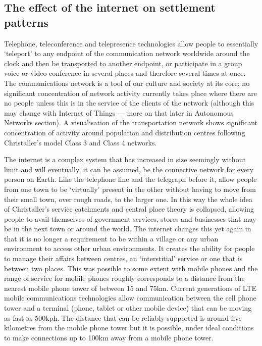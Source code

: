 \subsection{The effect of the internet on settlement patterns}
Telephone, teleconference and telepresence technologies allow people to essentially `teleport' to any endpoint of the communication network worldwide around the clock and then be transported to another endpoint, or participate in a group voice or video conference  in several places and therefore several times at once. The communications network is a tool of our culture and society at its core; no significant concentration of network activity currently takes place where there are no people unless this is in the service of the clients of the network (although this may change with Internet of Things --- more on that later in Autonomous Networks section). A visualisation of the transportation network shows significant concentration of activity around population and distribution centres following Christaller's model Class 3 and Class 4 networks. 


The internet is a complex system that has increased in size seemingly without limit and will eventually, it can be assumed, be the connective network for every person on Earth. Like the telephone line and the telegraph before it, allow people from one town to be `virtually' present in the other without having to move from their small town, over rough roads, to the larger one. In this way the whole idea of Christaller's service catchments and central place theory is collapsed, allowing people to avail themselves of government services, stores and businesses that may be in the next town or around the world. The internet changes this yet again in that it is no longer a requirement to be within a village or any urban environment to access other urban environments.  It creates the ability for people to manage their affairs between centres, an `interstitial' service or one that is between two places. This was possible to some extent with mobile phones and the range of service for mobile phones roughly corresponds to a distance from the nearest mobile phone tower of between 15 and 75km. Current generations of LTE mobile communications technologies allow communication between the cell phone tower and a terminal (phone, tablet or other mobile device) that can be moving as fast as 500kph. The distance that can be reliably supported is around five kilometres from the mobile phone tower but it is possible, under ideal conditions to make connections up to 100km away from a mobile phone tower\cite{RefWorks:327}.

